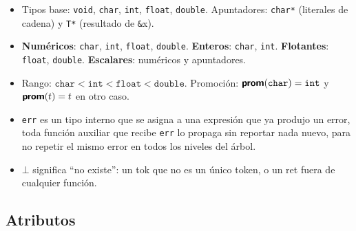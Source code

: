 \documentclass[11pt]{article}
\newcommand{\T}[1]{\textcolor{tcolor}{\texttt{#1}}}              %
\newcommand{\fn}[1]{\textsf{\textbf{#1}}}                        %
\newcommand{\ty}[1]{\texttt{#1}}                                 %
\begin{document}
\begin{itemize}[leftmargin=*]
  \item Tipos base: \ty{void}, \ty{char}, \ty{int}, \ty{float}, \ty{double}. Apuntadores: \ty{char*} (literales de cadena) y \ty{T*} (resultado de \T{\&}x).
  \item \textbf{Numéricos}: \ty{char}, \ty{int}, \ty{float}, \ty{double}. \textbf{Enteros}: \ty{char}, \ty{int}. \textbf{Flotantes}: \ty{float}, \ty{double}. \textbf{Escalares}: numéricos y apuntadores.
  \item Rango: $\ty{char} < \ty{int} < \ty{float} < \ty{double}$. Promoción: $\fn{prom}(\ty{char}) = \ty{int}$ y $\fn{prom}(t) = t$ en otro caso.
  \item \ty{err} es un tipo interno que se asigna a una expresión que ya produjo un error, toda función auxiliar que recibe \ty{err} lo propaga sin reportar nada nuevo, para no repetir el mismo error en todos los niveles del árbol.
  \item $\bot$ significa ``no existe'': un \textsf{tok} que no es un único token, o un \textsf{ret} fuera de cualquier función.
\end{itemize}

\subsection{Atributos}
\end{document}
